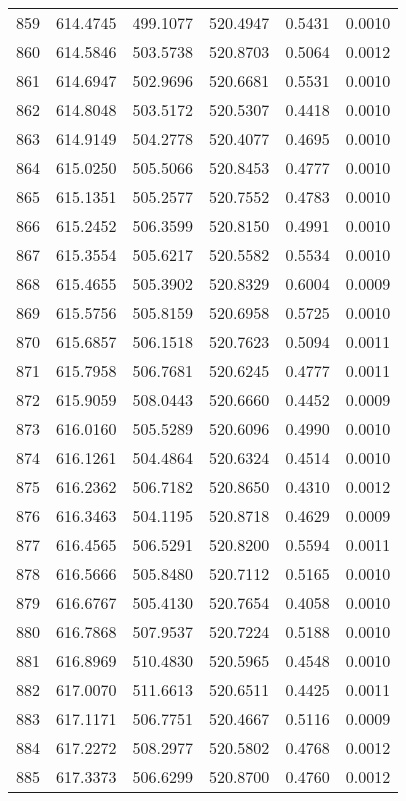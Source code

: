 \documentclass{article}
\begin{document}
\begin{longtable}{|c|c|c|c|c|c|}
859 & 614.4745 & 499.1077 & 520.4947 & 0.5431 & 0.0010 \\
860 & 614.5846 & 503.5738 & 520.8703 & 0.5064 & 0.0012 \\
861 & 614.6947 & 502.9696 & 520.6681 & 0.5531 & 0.0010 \\
862 & 614.8048 & 503.5172 & 520.5307 & 0.4418 & 0.0010 \\
863 & 614.9149 & 504.2778 & 520.4077 & 0.4695 & 0.0010 \\
864 & 615.0250 & 505.5066 & 520.8453 & 0.4777 & 0.0010 \\
865 & 615.1351 & 505.2577 & 520.7552 & 0.4783 & 0.0010 \\
866 & 615.2452 & 506.3599 & 520.8150 & 0.4991 & 0.0010 \\
867 & 615.3554 & 505.6217 & 520.5582 & 0.5534 & 0.0010 \\
868 & 615.4655 & 505.3902 & 520.8329 & 0.6004 & 0.0009 \\
869 & 615.5756 & 505.8159 & 520.6958 & 0.5725 & 0.0010 \\
870 & 615.6857 & 506.1518 & 520.7623 & 0.5094 & 0.0011 \\
871 & 615.7958 & 506.7681 & 520.6245 & 0.4777 & 0.0011 \\
872 & 615.9059 & 508.0443 & 520.6660 & 0.4452 & 0.0009 \\
873 & 616.0160 & 505.5289 & 520.6096 & 0.4990 & 0.0010 \\
874 & 616.1261 & 504.4864 & 520.6324 & 0.4514 & 0.0010 \\
875 & 616.2362 & 506.7182 & 520.8650 & 0.4310 & 0.0012 \\
876 & 616.3463 & 504.1195 & 520.8718 & 0.4629 & 0.0009 \\
877 & 616.4565 & 506.5291 & 520.8200 & 0.5594 & 0.0011 \\
878 & 616.5666 & 505.8480 & 520.7112 & 0.5165 & 0.0010 \\
879 & 616.6767 & 505.4130 & 520.7654 & 0.4058 & 0.0010 \\
880 & 616.7868 & 507.9537 & 520.7224 & 0.5188 & 0.0010 \\
881 & 616.8969 & 510.4830 & 520.5965 & 0.4548 & 0.0010 \\
882 & 617.0070 & 511.6613 & 520.6511 & 0.4425 & 0.0011 \\
883 & 617.1171 & 506.7751 & 520.4667 & 0.5116 & 0.0009 \\
884 & 617.2272 & 508.2977 & 520.5802 & 0.4768 & 0.0012 \\
885 & 617.3373 & 506.6299 & 520.8700 & 0.4760 & 0.0012 \\

\end{longtable}
\end{document}
